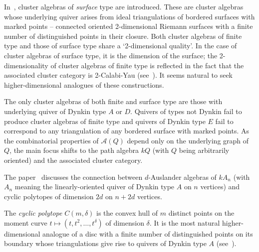 \documentclass[a4paper,oneside,svgnames]{amsart}
\theoremstyle{plain}
\theoremstyle{definition}
\begin{document}
 In~\cite{fst}, cluster algebras of \emph{surface} type are introduced. These
 are cluster algebras whose underlying quiver arises from ideal triangulations
 of bordered surfaces with marked points -- connected oriented 2-dimensional
 Riemann surfaces with a finite number of distinguished points in their closure.
 Both cluster algebras of finite type and those of surface type share a
 `2-dimensional quality'. In the case of cluster algebras of surface type, it is
 the dimension of the surface; the 2-dimensionality of cluster algebras of
 finite type is reflected in the fact that the associated cluster category is
 2-Calabi-Yau (see~\cite[Proposition~1.7]{bmrrt}). It seems natural to seek
 higher-dimensional analogues of these constructions.

 The only cluster algebras of both finite and surface type are those with
 underlying quiver of Dynkin type $A$ or $D$. Quivers of types not Dynkin fail
 to produce cluster algebras of finite type and quivers of Dynkin type $E$ fail
 to correspond to any triangulation of any bordered surface with marked points.
 As the combinatorial properties of $\mathcal{A}(Q)$ depend only on the
 underlying graph of $Q$, the main focus shifts to the path algebra $kQ$ (with
 $Q$ being arbitrarily oriented) and the associated cluster category.

 The paper~\cite{ot} discusses the connection between $d$-Auslander algebras of
 $kA_n$ (with $A_n$ meaning the linearly-oriented quiver of Dynkin type $A$ on
 $n$ vertices) and cyclic polytopes of dimension $2d$ on $n + 2d$ vertices. 

 The \emph{cyclic polytope} $C(m,\delta)$ is the convex hull of $m$ distinct
 points on the moment curve $t \mapsto (t,t^2,\ldots,t ^{\delta})$ of dimension
 $\delta$. It is the most natural higher-dimensional analogue of a disc with a
 finite number of distinguished points on its boundary whose triangulations give
 rise to quivers of Dynkin type $A$ (see~\cite{fst}).
\end{document}
